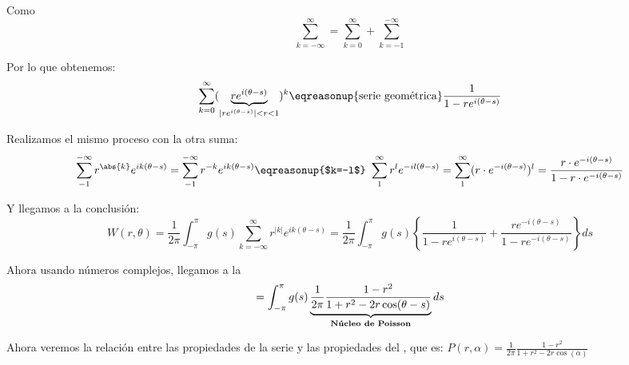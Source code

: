 		Como $$\sum\limits_{k=-\infty}^{\infty} = \sum\limits_{k=0}^{\infty} + \sum\limits_{k=-1}^{-\infty}$$

		Por lo que obtenemos:
		\[
		\sum_{k=0}^{\infty} (\underbrace{r e^{i (\theta-s)}}_{|re^{i(\theta-s)}| < r < 1})^k \eqreasonup{\text{serie geométrica}} \frac{1}{1-re^{i(\theta-s)}}
		\]

		Realizamos el mismo proceso con la otra suma:
		\begin{gather*}
			\sum\limits_{-1}^{-\infty} r^{\abs{k}} e^{ik(\theta-s)} = \sum\limits_{-1}^{-\infty} r^{-k} e^{ik(\theta-s)} \eqreasonup{$k=-l$} \ \sum\limits_{1}^{\infty} r^{l} e^{-il(\theta-s)} = \sum\limits_{1}^{\infty} (r \cdot e^{-i(\theta-s)})^l = \frac{r \cdot e^{-i(\theta-s)}}{1-r \cdot e^{-i(\theta-s)}}
		\end{gather*}

		Y llegamos a la conclusión:
		\[
		W(r,\theta) = \frac{1}{2\pi} \int_{-\pi}^\pi g(s) \sum_{k=-\infty}^\infty r^{|k|} e^{ik(\theta-s)} = \frac{1}{2\pi} \int_{-\pi}^\pi g(s) \left\{ \frac{1}{1-re^{i(\theta-s)}} + \frac{re^{-i(\theta-s)}}{1-re^{-i(\theta-s)}} \right\} ds	\]

		Ahora usando números complejos, llegamos a la 
		\[ = \int^{\pi}_{-\pi} g(s) \underbrace{\frac{1}{2\pi} \frac{1-r^2}{1+r^2-2r\cos (\theta - s)}}_{\text{\bf Núcleo de Poisson}} ds \]

		Ahora veremos la relación entre las propiedades de la serie y las propiedades del , que es:
		\( P(r,\alpha) = \frac{1}{2\pi} \frac{1-r^2}{1+r^2-2r\cos (\alpha)} \label{eq:NucleoPoisson} \)

